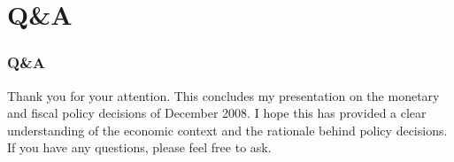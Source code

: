 \documentclass{beamer}
\begin{document}
\section{Q\&A}
\begin{frame}
    \frametitle{Q\&A}
    Thank you for your attention. This concludes my presentation on the monetary and fiscal policy decisions of December 2008. I hope this has provided a clear understanding of the economic context and the rationale behind policy decisions. If you have any questions, please feel free to ask.
\end{frame}
\end{document}
